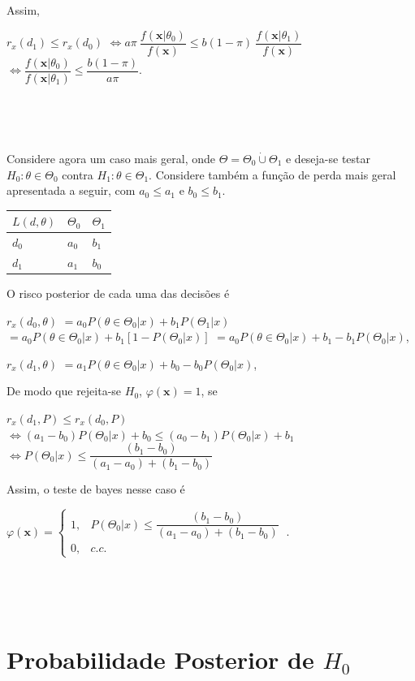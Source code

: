 \documentclass[
]{book}
\begin{document}
Assim,

\(r_x(d_1) \leq r_x(d_0)\)
\(\Longleftrightarrow a \pi~\dfrac{f(\boldsymbol x|\theta_0)}{f(\boldsymbol x)} \leq b (1-\pi)~\dfrac{f(\boldsymbol x|\theta_1)}{f(\boldsymbol x)}\)
\(\Longleftrightarrow \dfrac{f(\boldsymbol x|\theta_0)}{f(\boldsymbol x|\theta_1)} \leq \dfrac{b (1-\pi)}{a \pi}\).

\(~\)

\(~\)

Considere agora um caso mais geral, onde \(\Theta=\Theta_0 \dot{\cup} \Theta_1\) e deseja-se testar \(H_0: \theta \in \Theta_0\) contra \(H_1: \theta \in \Theta_1\). Considere também a função de perda mais geral apresentada a seguir, com \(a_0 \leq a_1\) e \(b_0 \leq b_1\).

\begin{tabular}{lll}
\toprule
$L(d,\theta)$ & $\Theta_0$ & $\Theta_1$\\
\midrule
$d_0$ & $a_0$ & $b_1$\\
$d_1$ & $a_1$ & $b_0$\\
\bottomrule
\end{tabular}

O risco posterior de cada uma das decisões é

\(r_x(d_0,\theta)\) \(=a_0P(\theta\in\Theta_0|x)+b_1P(\Theta_1|x)\) \(=a_0P(\theta\in\Theta_0|x)+b_1\left[1- P(\Theta_0|x)\right]\) \(=a_0P(\theta\in\Theta_0|x)+b_1-b_1P(\Theta_0|x)\),

\(r_x(d_1,\theta)\) \(=a_1P(\theta\in\Theta_0|x)+b_0-b_0P(\Theta_0|x)\),

De modo que rejeita-se \(H_0\), \(\varphi(\boldsymbol x)=1\), se

\(r_x(d_1,P)\leq r_x(d_0,P)\) \(\Leftrightarrow (a_1-b_0)P(\Theta_0|x)+b_0 \leq (a_0-b_1)P(\Theta_0|x)+b_1\) \(\Leftrightarrow P(\Theta_0|x) \leq \dfrac{(b_1-b_0)}{(a_1-a_0)+(b_1-b_0)}\)

Assim, o teste de bayes nesse caso é

\({\varphi}(\boldsymbol x)=\left\{\begin{array}{rl} 1,& P(\Theta_0|x) \leq \dfrac{(b_1-b_0)}{(a_1-a_0)+(b_1-b_0)} \\ 0,& c.c.\end{array}\right.~.\)

\(~\)

\(~\)

\hypertarget{probabilidade-posterior-de-h_0}{%
\section{\texorpdfstring{Probabilidade Posterior de \(H_0\)}{Probabilidade Posterior de H\_0}}\label{probabilidade-posterior-de-h_0}}
\end{document}
